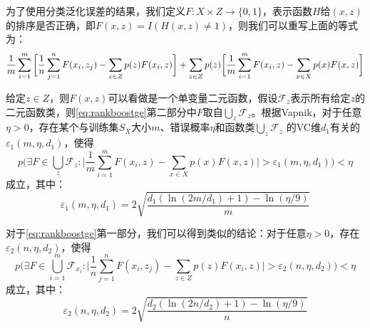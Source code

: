 为了使用分类泛化误差的结果，我们定义$F:X\times Z \rightarrow \{0,1\}$，表示函数$H$给$(x,z)$的排序是否正确，即$F(x,z) = I(H(x,z)\ne 1)$，则我们可以重写上面的等式为：
\begin{equation}\label{eq:rankboostge}
    \frac{1}{m} \sum\limits_{i=1}^m \bigg[\frac{1}{n} \sum\limits_{j=1}^n F(x_i,z_j)-\sum\limits_{z\in Z} p(z) F(x_i,z)\bigg]\\
      +  \sum\limits_{z\in Z} p(z)\bigg[\frac{1}{m} \sum\limits_{i=1}^m F(x_i,z) -  \sum\limits_{x\in X} p(x) F(x,z) \bigg]\\
\end{equation}

给定$z\in Z$，则$F(x,z)$可以看做是一个单变量二元函数，假设$\mathcal{F}_z$表示所有给定$z$的二元函数类，则\eqref{eq:rankboostge}第二部分中$F$取自$\bigcup\limits_z \mathcal{F}_z$。根据Vapnik\cite{vapnik1982estimation}，对于任意$\eta>0$，存在某个与训练集$S_X$大小$m$、错误概率$\eta$和函数类$\bigcup\limits_z \mathcal{F}_z$ 的VC维$d_1$有关的$\varepsilon_1(m,\eta,d_1)$，使得
\begin{equation}
    p\bigg(\exists F\in \bigcup\limits_z \mathcal{F}_z: \bigg|\frac{1}{m} \sum\limits_{i=1}^m F(x_i,z) -  \sum\limits_{x\in X} p(x) F(x,z) \bigg| > \varepsilon_1(m,\eta,d_1) \bigg) < \eta
\end{equation}
成立，其中：
\begin{equation}
    \varepsilon_1(m,\eta,d_1) = 2\sqrt{\frac{d_1(\ln(2m/d_1) + 1) - \ln(\eta/9)}{m}}
\end{equation}

对于\eqref{eq:rankboostge}第一部分，我们可以得到类似的结论：对于任意$\eta>0$，存在$\varepsilon_2(n,\eta,d_2)$，使得
\begin{equation}
    p\bigg(\exists F\in \bigcup\limits_{i=1}^m \mathcal{F}_{x_i}: \bigg|\frac{1}{n} \sum\limits_{j=1}^n F(x_i,z_j)-\sum\limits_{z\in Z} p(z) F(x_i,z) \bigg| > \varepsilon_2(n,\eta,d_2) \bigg) < \eta
\end{equation}
成立，其中：
\begin{equation}
    \varepsilon_2(n,\eta,d_2) = 2\sqrt{\frac{d_2(\ln(2n/d_2) + 1) - \ln(\eta/9)}{n}}
\end{equation}

